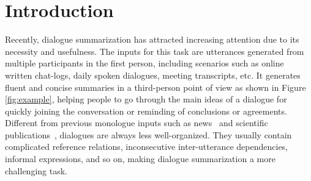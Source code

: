 \section{Introduction}
\label{sec:intro}



Recently, dialogue summarization has attracted increasing attention due to its necessity and usefulness. The inputs for this task are utterances generated from multiple participants in the first person, including scenarios such as online written chat-logs, daily spoken dialogues, meeting transcripts, etc. 
It generates fluent and concise summaries in a third-person point of view as shown in Figure \ref{fig:example}, helping people to go through the main ideas of a dialogue for quickly joining the conversation or reminding of conclusions or agreements.  
Different from previous monologue inputs such as news~\cite{narayan2018don} and scientific publications~\cite{cohan2018discourse}, dialogues are always less well-organized. They usually contain complicated reference relations, inconsecutive inter-utterance dependencies, informal expressions, and so on, making dialogue summarization a more challenging task.



